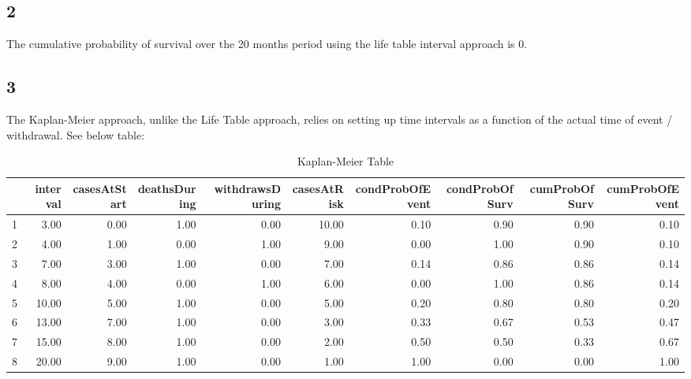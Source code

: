\documentclass[12pt]{article}
\begin{document}
\subsection*{2}
The cumulative probability of survival over the 20 months period using the life table interval approach is 0. \\

\subsection*{3}
The Kaplan-Meier approach, unlike the Life Table approach, relies on setting up time intervals as a function of the actual time of event / withdrawal.  See below table:


\begin{table}[ht]
\centering
\caption{Kaplan-Meier Table} 
{\tiny
\begin{tabular}{rrrrrrrrrr}
  \hline
 & interval & casesAtStart & deathsDuring & withdrawsDuring & casesAtRisk & condProbOfEvent & condProbOfSurv & cumProbOfSurv & cumProbOfEvent \\ 
  \hline
1 & 3.00 & 0.00 & 1.00 & 0.00 & 10.00 & 0.10 & 0.90 & 0.90 & 0.10 \\ 
  2 & 4.00 & 1.00 & 0.00 & 1.00 & 9.00 & 0.00 & 1.00 & 0.90 & 0.10 \\ 
  3 & 7.00 & 3.00 & 1.00 & 0.00 & 7.00 & 0.14 & 0.86 & 0.86 & 0.14 \\ 
  4 & 8.00 & 4.00 & 0.00 & 1.00 & 6.00 & 0.00 & 1.00 & 0.86 & 0.14 \\ 
  5 & 10.00 & 5.00 & 1.00 & 0.00 & 5.00 & 0.20 & 0.80 & 0.80 & 0.20 \\ 
  6 & 13.00 & 7.00 & 1.00 & 0.00 & 3.00 & 0.33 & 0.67 & 0.53 & 0.47 \\ 
  7 & 15.00 & 8.00 & 1.00 & 0.00 & 2.00 & 0.50 & 0.50 & 0.33 & 0.67 \\ 
  8 & 20.00 & 9.00 & 1.00 & 0.00 & 1.00 & 1.00 & 0.00 & 0.00 & 1.00 \\ 
   \hline
\end{tabular}
}
\end{table}
\end{document}
